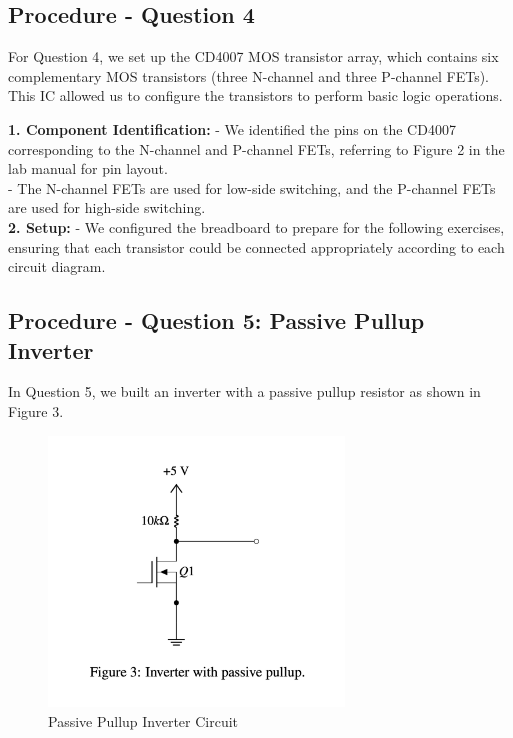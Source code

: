 \documentclass{article}
\begin{document}
   \subsection*{\textbf{Procedure - Question 4}}
   For Question 4, we set up the CD4007 MOS transistor array, which contains six complementary MOS transistors (three N-channel and three P-channel FETs). This IC allowed us to configure the transistors to perform basic logic operations.
   
   \textbf{1. Component Identification:}
      - We identified the pins on the CD4007 corresponding to the N-channel and P-channel FETs, referring to Figure 2 in the lab manual for pin layout.
      \\
      - The N-channel FETs are used for low-side switching, and the P-channel FETs are used for high-side switching.
      \\
   
   \textbf{2. Setup:}
      - We configured the breadboard to prepare for the following exercises, ensuring that each transistor could be connected appropriately according to each circuit diagram.
      \\

    \subsection*{\textbf{Procedure - Question 5: Passive Pullup Inverter}}
    In Question 5, we built an inverter with a passive pullup resistor as shown in Figure 3.

    \begin{figure}[H]
        \centering
        \includegraphics[width=0.7\textwidth]{./img/Lab 10/10_5_1.png}
        \caption{Passive Pullup Inverter Circuit}
        \label{fig:passive_pullup_inverter}
    \end{figure}
\end{document}
